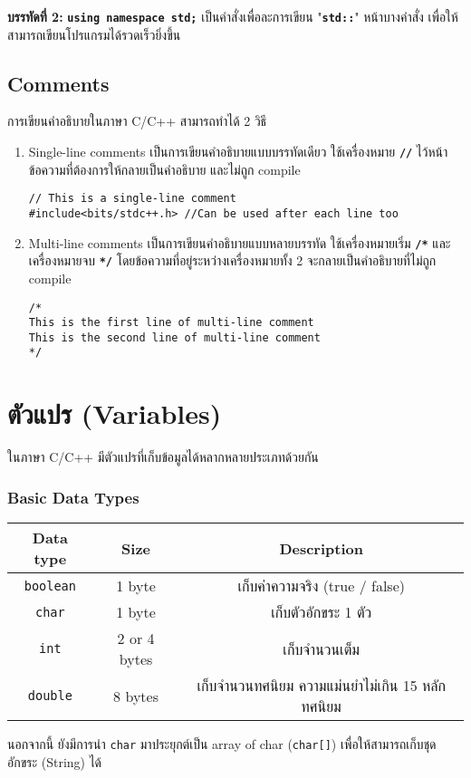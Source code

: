 \textbf{บรรทัดที่ 2:} \textbf{\texttt{using namespace std;}} เป็นคำสั่งเพื่อละการเขียน "\textbf{\texttt{std::}}" หน้าบางคำสั่ง เพื่อให้สามารถเขียนโปรแกรมได้รวดเร็วยิ่งขึ้น

\subsection{Comments}
การเขียนคำอธิบายในภาษา C/C++ สามารถทำได้ 2 วิธี
\begin{enumerate}
\item Single-line comments เป็นการเขียนคำอธิบายแบบบรรทัดเดียว ใช้เครื่องหมาย \textbf{\texttt{//}} ไว้หน้าข้อความที่ต้องการให้กลายเป็นคำอธิบาย และไม่ถูก compile 
\begin{lstlisting}
// This is a single-line comment
#include<bits/stdc++.h>	//Can be used after each line too 
\end{lstlisting}
\item Multi-line comments เป็นการเขียนคำอธิบายแบบหลายบรรทัด ใช้เครื่องหมายเริ่ม \textbf{\texttt{/*}} และเครื่องหมายจบ \textbf{\texttt{*/}} โดยข้อความที่อยู่ระหว่างเครื่องหมายทั้ง 2 จะกลายเป็นคำอธิบายที่ไม่ถูก compile
\begin{lstlisting}
/*
This is the first line of multi-line comment
This is the second line of multi-line comment
*/
\end{lstlisting}
\end{enumerate}

\section{ตัวแปร (Variables)}
ในภาษา C/C++ มีตัวแปรที่เก็บข้อมูลได้หลากหลายประเภทด้วยกัน
\subsubsection{Basic Data Types}
\begin{center}
\begin{tabular}{||c|c|c||}
\hline
\textbf{Data type} & \textbf{Size} & \textbf{Description} \\
\hline
\texttt{boolean} & 1 byte & เก็บค่าความจริง (true / false) \\
\texttt{char} & 1 byte & เก็บตัวอักขระ 1 ตัว \\
\texttt{int} & 2 or 4 bytes & เก็บจำนวนเต็ม \\
\texttt{double} & 8 bytes & เก็บจำนวนทศนิยม ความแม่นยำไม่เกิน 15 หลักทศนิยม \\
\hline
\end{tabular}
\end{center}
นอกจากนี้ ยังมีการนำ \texttt{char} มาประยุกต์เป็น array of char (\texttt{char[]}) เพื่อให้สามารถเก็บชุดอักขระ (String) ได้
